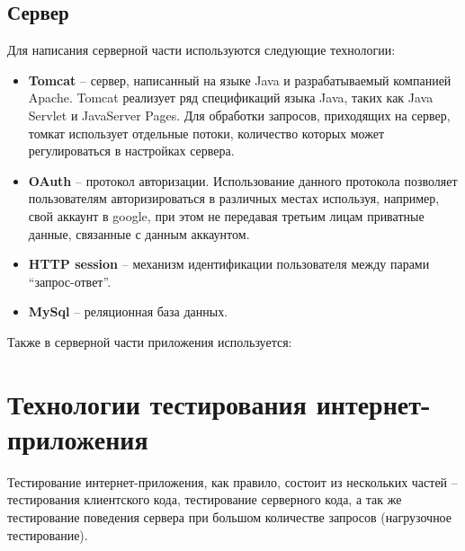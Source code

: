 
\subsection{Сервер}
	Для написания серверной части используются следующие технологии:
\begin{itemize}
\item \textbf{Tomcat} -- сервер, написанный на языке Java и разрабатываемый компанией Apache. Tomcat реализует ряд спецификаций языка Java, таких как Java Servlet и JavaServer Pages. Для обработки запросов, приходящих на сервер, томкат использует отдельные потоки, количество которых может регулироваться в настройках сервера.
\item \textbf{OAuth} -- протокол авторизации. Использование данного протокола позволяет пользователям авторизироваться в различных местах используя, например, свой аккаунт в google, при этом не передавая третьим лицам приватные данные, связанные с данным аккаунтом.
\item \textbf{HTTP session} -- механизм идентификации пользователя между парами ``запрос-ответ''.
\item \textbf{MySql} -- реляционная база данных.
\end{itemize}
 
	
	Также в серверной части приложения используется:
	
\section{Технологии тестирования интернет-приложения}
	Тестирование интернет-приложения, как правило, состоит из нескольких частей -- тестирования клиентского кода, тестирование серверного кода, а так же тестирование поведения сервера при большом количестве запросов (нагрузочное тестирование).
	
